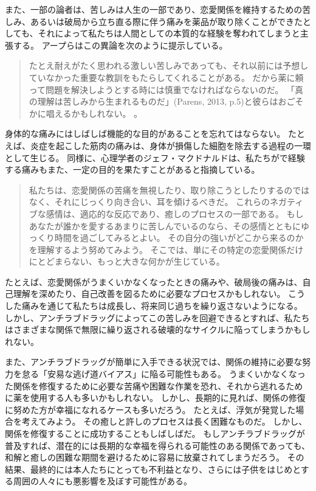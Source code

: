 \documentclass[paper=a4,book,openany]{jlreq}
\newcommand{\ig}[1]{}           %
\begin{document}
また、一部の論者は、苦しみは人生の一部であり、恋愛関係を維持するための苦しみ、あるいは破局から立ち直る際に伴う痛みを薬品が取り除くことができたとしても、それによって私たちは人間としての本質的な経験を奪われてしまうと主張する。
アープらはこの異論を次のように提示している。

\begin{quote}
たとえ耐えがたく思われる激しい苦しみであっても、それ以前には予想していなかった重要な教訓をもたらしてくれることがある。
だから薬に頼って問題を解決しようとする時には慎重でなければならないのだ。
「真の理解は苦しみから生まれるものだ」(Parens, 2013, p.5)\ig{Parens}と彼らはおごそかに唱えるかもしれない。
\citep[p.12]{earp13:_if_i_could_just_stop_lovin_you}\nocite{parens13:_good_bad_forms_medic}。
\end{quote}

身体的な痛みにはしばしば機能的な目的があることを忘れてはならない。
たとえば、炎症を起こした筋肉の痛みは、身体が損傷した細胞を除去する過程の一環として生じる。
同様に、心理学者のジェフ・マクドナルド\ig{(Geoff MacDonald)}は、私たちがで経験する痛みもまた、一定の目的を果たすことがあると指摘している。

\begin{quote}
私たちは、恋愛関係の苦痛を無視したり、取り除こうとしたりするのではなく、それにじっくり向き合い、耳を傾けるべきだ。
これらのネガティブな感情は、適応的な反応であり、癒しのプロセスの一部である。
もしあなたが誰かを愛するあまりに苦しんでいるのなら、その感情とともにゆっくり時間を過ごしてみるとよい。
その自分の強いがどこから来るのかを理解するよう努めてみよう。
そこでは、単にその特定の恋愛関係だけにとどまらない、もっと大きな何かが生じている。
\citep{lawson17:_why_does_love_hurt_so_much}
\end{quote}

たとえば、恋愛関係がうまくいかなくなったときの痛みや、破局後の痛みは、自己理解を深めたり、自己改善を図るために必要なプロセスかもしれない。
こうした痛みを通じて私たちは成長し、将来同じ過ちを繰り返さないようになる。
しかし、アンチラブドラッグによってこの苦しみを回避できるとすれば、私たちはさまざまな関係で無限に繰り返される破壊的なサイクルに陥ってしまうかもしれない。

また、アンチラブドラッグが簡単に入手できる状況では、関係の維持に必要な努力を怠る「安易な逃げ道バイアス」に陥る可能性もある。
うまくいかなくなった関係を修復するために必要な苦痛や困難な作業を恐れ、それから逃れるために薬を使用する人も多いかもしれない。
しかし、長期的に見れば、関係の修復に努めた方が幸福になれるケースも多いだろう。
たとえば、浮気が発覚した場合を考えてみよう。
その癒しと許しのプロセスは長く困難なものだ。
しかし、関係を修復することに成功することもしばしばだ。
もしアンチラブドラッグが普及すれば、潜在的には長期的な幸福を得られる可能性のある関係であっても、和解と癒しの困難な期間を避けるために容易に放棄されてしまうだろう。
その結果、最終的には本人たちにとっても不利益となり、さらには子供をはじめとする周囲の人々にも悪影響を及ぼす可能性がある。
\end{document}
